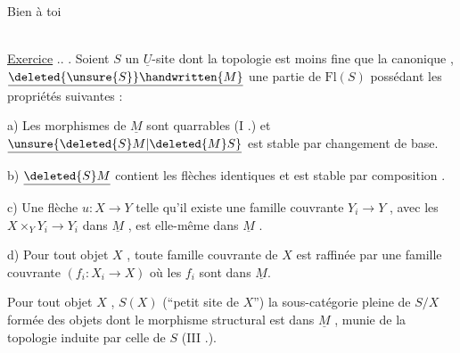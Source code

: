 \begin{flushright}
Bien à toi\\
\\
\end{flushright}

\uline{Exercice} .. . Soient \(S\) un \(\underline{U}\)-site dont la topologie est moins fine que la canonique , \(\underline{\deleted{\unsure{S}}\handwritten{M}}\) une partie de \(\mathrm{Fl}(S)\) possédant les propriétés suivantes :

 a) Les morphismes de \(\underline{M}\) sont quarrables (I .) et \(\underline{\unsure{\deleted{S}M|\deleted{M}S}}\) est stable par changement de base.

 b) \(\underline{\deleted{S}M}\) contient les flèches identiques et est stable par composition .

 c) Une flèche \(u:X\to Y\) telle qu'il existe une famille couvrante \(Y_i\to Y\) , avec les \(X\times_Y Y_i\to Y_i\) dans \(\underline{M}\) , est elle-même dans \(\underline{M}\) .

 d) Pour tout objet \(X\) , toute famille couvrante de \(X\) est raffinée par une famille couvrante \((f_i:X_i\to X)\) où les \(f_i\) sont dans \(\underline{M}\).

Pour tout objet \(X\) ,  \(S(X)\) (``petit site de \(X\)'')%
%
\reversemarginpar
{}
\normalmarginpar
{} la sous-catégorie pleine de \(S/X\) formée des objets dont le morphisme structural est dans \(\underline{M}\) , munie de la topologie induite par celle de \(S\) (III .).

